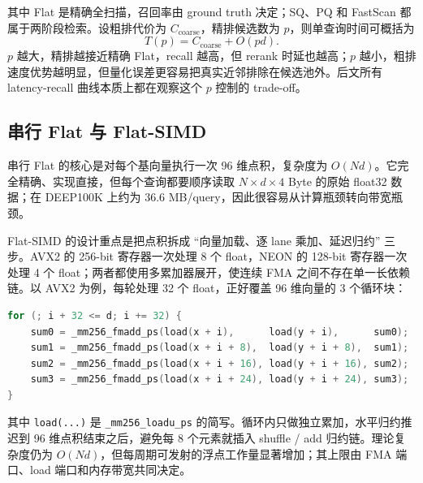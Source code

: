 \documentclass[a4paper,11pt,UTF8]{ctexart}
\begin{document}
其中 Flat 是精确全扫描，召回率由 ground truth 决定；SQ、PQ 和 FastScan 都属于两阶段检索。设粗排代价为 $C_{\mathrm{coarse}}$，精排候选数为 $p$，则单查询时间可概括为
\[
T(p)=C_{\mathrm{coarse}} + O(p d).
\]
$p$ 越大，精排越接近精确 Flat，recall 越高，但 rerank 时延也越高；$p$ 越小，粗排速度优势越明显，但量化误差更容易把真实近邻排除在候选池外。后文所有 latency-recall 曲线本质上都在观察这个 $p$ 控制的 trade-off。

\subsection{串行 Flat 与 Flat-SIMD}

串行 Flat 的核心是对每个基向量执行一次 96 维点积，复杂度为 $O(Nd)$。它完全精确、实现直接，但每个查询都要顺序读取 $N\times d\times 4$ Byte 的原始 float32 数据；在 DEEP100K 上约为 36.6 MB/query，因此很容易从计算瓶颈转向带宽瓶颈。

Flat-SIMD 的设计重点是把点积拆成 ``向量加载、逐 lane 乘加、延迟归约'' 三步。AVX2 的 256-bit 寄存器一次处理 8 个 float，NEON 的 128-bit 寄存器一次处理 4 个 float；两者都使用多累加器展开，使连续 FMA 之间不存在单一长依赖链。以 AVX2 为例，每轮处理 32 个 float，正好覆盖 96 维向量的 3 个循环块：
\begin{lstlisting}[language=C++,caption=Flat-AVX2 的四累加器点积结构（示意）]
for (; i + 32 <= d; i += 32) {
    sum0 = _mm256_fmadd_ps(load(x + i),      load(y + i),      sum0);
    sum1 = _mm256_fmadd_ps(load(x + i + 8),  load(y + i + 8),  sum1);
    sum2 = _mm256_fmadd_ps(load(x + i + 16), load(y + i + 16), sum2);
    sum3 = _mm256_fmadd_ps(load(x + i + 24), load(y + i + 24), sum3);
}
\end{lstlisting}
其中 \texttt{load(...)} 是 \texttt{\_mm256\_loadu\_ps} 的简写。循环内只做独立累加，水平归约推迟到 96 维点积结束之后，避免每 8 个元素就插入 shuffle / add 归约链。理论复杂度仍为 $O(Nd)$，但每周期可发射的浮点工作量显著增加；其上限由 FMA 端口、load 端口和内存带宽共同决定。
\end{document}
